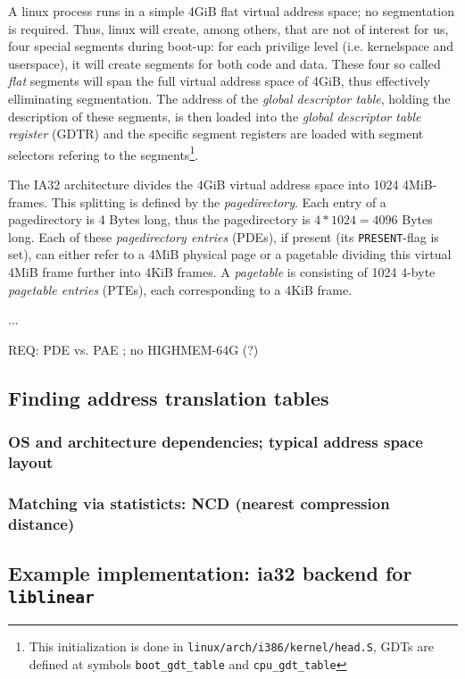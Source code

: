 A linux process runs in a simple 4GiB flat virtual address space; no
segmentation is required. Thus, linux will create, among others, that are not of
interest for us, four special segments during boot-up: for each privilige level
(i.e. kernelspace and userspace), it will create segments for both code and
data. These four so called \emph{flat} segments will span the full virtual
address space of 4GiB, thus effectively elliminating segmentation. The address
of the \emph{global descriptor table}, holding the description of these
segments, is then loaded into the \emph{global descriptor table register} (GDTR)
and the specific segment registers are loaded with segment selectors refering to
the segments\footnote{This initialization is done in
\texttt{linux/arch/i386/kernel/head.S}, GDTs are defined at symbols
\texttt{boot\_gdt\_table} and \texttt{cpu\_gdt\_table}}.

The IA32 architecture divides the 4GiB virtual address space into 1024
4MiB-frames. This splitting is defined by the \emph{pagedirectory}. Each entry
of a pagedirectory is 4 Bytes long, thus the pagedirectory is $4*1024 = 4096$
Bytes long. Each of these \emph{pagedirectory entries} (PDEs), if present (its
\texttt{PRESENT}-flag is set), can either refer to a 4MiB physical page or a
pagetable dividing this virtual 4MiB frame further into 4KiB frames. A
\emph{pagetable} is consisting of 1024 4-byte \emph{pagetable entries} (PTEs),
each corresponding to a 4KiB frame.

...

REQ: PDE vs. PAE ; no HIGHMEM-64G (?)

\subsection{Finding address translation tables}
\label{findingATT}

\subsubsection{OS and architecture dependencies; typical address space layout}

\subsubsection{Matching via statisticts: NCD (nearest compression distance)}



\subsection{Example implementation: ia32 backend for \texttt{liblinear}}



